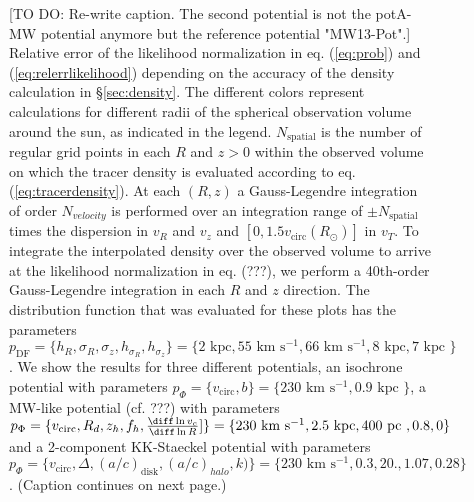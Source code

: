 
\begin{figure}
\caption{[TO DO: Re-write caption. The second potential is not the potA-MW potential anymore but the reference potential "MW13-Pot".] Relative error of the likelihood normalization in eq. (\ref{eq:prob}) and (\ref{eq:relerrlikelihood}) depending on the accuracy of the density calculation in \S\ref{sec:density}. The different colors represent calculations for different radii of the spherical observation volume around the sun, as indicated in the legend. $N_\text{spatial}$ is the number of regular grid points in each $R$ and $z > 0$ within the observed volume on which the tracer density is evaluated according to eq. (\ref{eq:tracerdensity}). At each $(R,z)$ a Gauss-Legendre integration of order $N_{velocity}$ is performed over an integration range of $\pm N_\text{spatial}$ times the dispersion in $v_R$ and $v_z$ and $[0,1.5v_\text{circ}(R_\odot)]$ in $v_T$. To integrate the interpolated density over the observed volume to arrive at the likelihood normalization in eq. (???), we perform a 40th-order Gauss-Legendre integration in each $R$ and $z$ direction. The distribution function that was evaluated for these plots has the parameters $p_\text{DF} = \{ h_R, \sigma_R, \sigma_z,h_{\sigma_R},h_{\sigma_z}\} =\{2 \text{ kpc}, 55 \text{ km s$^{-1}$}, 66 \text{ km s$^{-1}$}, 8 \text{ kpc}, 7 \text{ kpc }\} $. We show the results for three different potentials, an isochrone potential with parameters $p_\Phi = \{v_\text{circ},b \}=\{230 \text{ km s$^{-1}$},0.9\text{ kpc } \}$, a MW-like potential (cf. ???) with parameters $p_\Phi = \{v_\text{circ},R_d,z_h,f_h,\frac{\diff\ln v_c}{\diff\ln R}] \}=\{230 \text{ km s$^{-1}$},2.5\text{ kpc},400 \text{ pc }, 0.8,0\}$ and a 2-component KK-Staeckel potential with parameters $p_\Phi = \{v_\text{circ}, \Delta, (a/c)_\text{disk},(a/c)_{halo},k)\} = \{230\text{ km s$^{-1}$},0.3,20.,1.07, 0.28\}$. (Caption continues on next page.)} 
\label{fig:norm_accuracy}
\end{figure}

